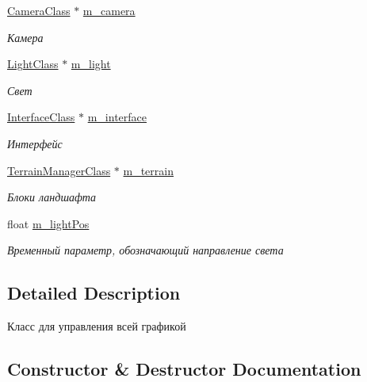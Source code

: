 \begin{DoxyCompactItemize}
\hyperlink{class_camera_class}{Camera\+Class} $\ast$ \hyperlink{class_graphics_class_a2a3e22483c2e954d390f7e7b7c4d5e28}{m\+\_\+camera}
\begin{DoxyCompactList}\small\item\em Камера \end{DoxyCompactList}\item 
\hyperlink{class_light_class}{Light\+Class} $\ast$ \hyperlink{class_graphics_class_a9b0ed300a203e32ae3fd1e48bbc8569f}{m\+\_\+light}
\begin{DoxyCompactList}\small\item\em Свет \end{DoxyCompactList}\item 
\hyperlink{class_interface_class}{Interface\+Class} $\ast$ \hyperlink{class_graphics_class_aa74088a2161fa1c8acf7182f156e57c1}{m\+\_\+interface}
\begin{DoxyCompactList}\small\item\em Интерфейс \end{DoxyCompactList}\item 
\hyperlink{class_terrain_manager_class}{Terrain\+Manager\+Class} $\ast$ \hyperlink{class_graphics_class_a06b2de9675cae31afdf6b4f30380a556}{m\+\_\+terrain}
\begin{DoxyCompactList}\small\item\em Блоки ландшафта \end{DoxyCompactList}\item 
float \hyperlink{class_graphics_class_a47cefb94cbe3f3e22e5f44aee0838ae8}{m\+\_\+light\+Pos}
\begin{DoxyCompactList}\small\item\em Временный параметр, обозначающий направление света \end{DoxyCompactList}\end{DoxyCompactItemize}


\subsection{Detailed Description}
Класс для управления всей графикой 

\subsection{Constructor \& Destructor Documentation}
\mbox{\label{class_graphics_class_abb55af7fd58b928ecade44b2a950415a}} 
